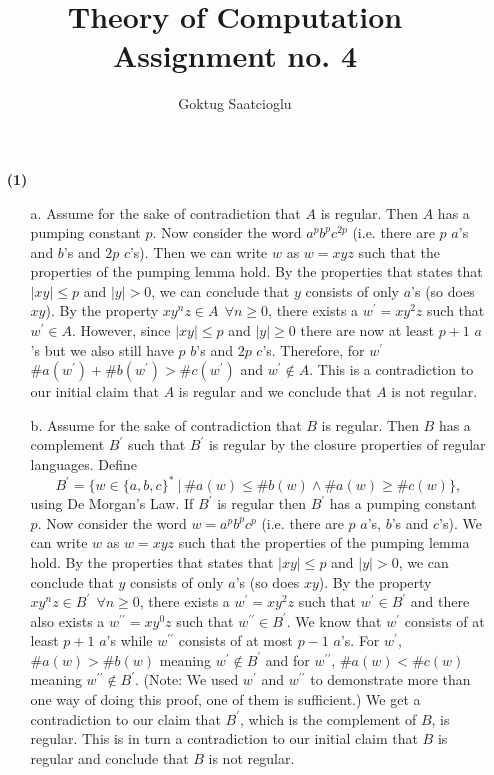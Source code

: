 \documentclass [10pt]{article}
\begin{document}
\title{Theory of Computation Assignment no. 4}
\author{Goktug Saatcioglu}
\date{}
\maketitle

\begin{enumerate}
	\item[\textbf{(1)}]
	\begin{enumerate}
		\item[a.]Assume for the sake of contradiction that $A$ is regular. Then $A$ has a pumping constant $p$. Now consider the word $a^{p}b^{p}c^{2p}$ (i.e. there are $p$ $a$'s and $b$'s and $2p$ $c$'s). Then we can write $w$ as $w = xyz$ such that the properties of the pumping lemma hold. By the properties that states that $\left|xy\right| \le p$ and $\left|y\right| > 0$, we can conclude that $y$ consists of only $a$'s (so does $xy$). By the property $xy^{n}z \in A\:\:\forall n \ge 0$, there exists a $w^{\prime} = xy^{2}z$ such that $w^{\prime} \in A$. However, since $\left|xy\right| \le p$ and $\left|y\right| \ge 0$ there are now at least $p + 1$ $a$'s but we also still have $p$ $b$'s and $2p$ $c$'s. Therefore, for $w^{\prime}$ $\#a(w^{\prime}) + \#b(w^{\prime}) > \#c(w^{\prime})$ and $w^{\prime} \notin A$. This is a contradiction to our initial claim that $A$ is regular and we conclude that $A$ is not regular.
		\item[b.]Assume for the sake of contradiction that $B$ is regular. Then $B$ has a complement $B^{\prime}$ such that $B^{\prime}$ is regular by the closure properties of regular languages. Define$$B^{\prime} = \{w\in\{a,b,c\}^{*}\:|\:\#a(w)\le\#b(w)\land\#a(w)\ge\#c(w)\},$$using De Morgan's Law. If $B^{\prime}$ is regular then $B^{\prime}$ has a pumping constant $p$. Now consider the word $w=a^{p}b^{p}c^{p}$ (i.e. there are $p$ $a$'s, $b$'s and $c$'s). We can write $w$ as $w=xyz$ such that the properties of the pumping lemma hold. By the properties that states that $\left|xy\right| \le p$ and $\left|y\right| > 0$, we can conclude that $y$ consists of only $a$'s (so does $xy$). By the property $xy^{n}z \in B^{\prime}\:\:\forall n \ge 0$, there exists a $w^{\prime} = xy^{2}z$ such that $w^{\prime} \in B^{\prime}$ and there also exists a $w^{\prime\prime} = xy^{0}z$ such that $w^{\prime\prime} \in B^{\prime}$. We know that $w^{\prime}$ consists of at least $p+1$ $a$'s while $w^{\prime\prime}$ consists of at most $p-1$ $a$'s. For $w^{\prime}$, $\#a(w)>\#b(w)$ meaning $w^{\prime} \notin B^{\prime}$ and for $w^{\prime\prime}$, $\#a(w)<\#c(w)$ meaning $w^{\prime\prime} \notin B^{\prime}$. (Note: We used $w^{\prime}$ and $w^{\prime\prime}$ to demonstrate more than one way of doing this proof, one of them is sufficient.) We get a contradiction to our claim that $B^{\prime}$, which is the complement of $B$, is regular. This is in turn a contradiction to our initial claim that $B$ is regular and conclude that $B$ is not regular.

\end{enumerate}
\end{enumerate}
\end{document}
